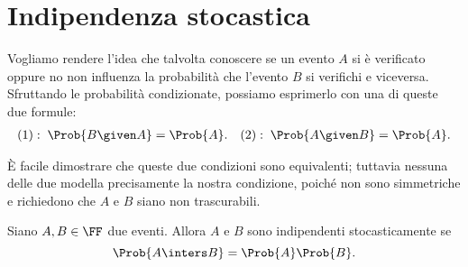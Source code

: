 \section{Indipendenza stocastica}

Vogliamo rendere l'idea che talvolta conoscere se un evento $A$ si è verificato oppure no non influenza la probabilità che l'evento $B$ si verifichi e viceversa. Sfruttando le probabilità condizionate, possiamo esprimerlo con una di queste due formule: \begin{align*}
    &(1):\; \Prob{B \given A} = \Prob{A}. &(2):\; \Prob{A \given B} = \Prob{A}.
\end{align*}

È facile dimostrare che queste due condizioni sono equivalenti; tuttavia nessuna delle due modella precisamente la nostra condizione, poiché non sono simmetriche e richiedono che $A$ e $B$ siano non trascurabili.

\begin{definition}
     Siano $A, B \in \FF$ due eventi. Allora $A$ e $B$ sono indipendenti stocasticamente se \[
        \Prob{A \inters B} = \Prob{A}\Prob{B}.    
    \]
\end{definition}

